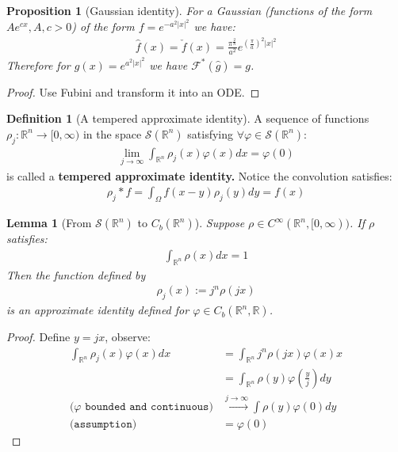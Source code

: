 \documentclass[a4paper,11pt,fleqn]{book}
\newtheorem{lemma}[theorem]{Lemma}
\newtheorem{proposition}[theorem]{Proposition}
\theoremstyle{definition}
\newtheorem{definition}{Definition}[section]
\theoremstyle{remark}
\begin{document}
\begin{proposition}[Gaussian identity]
	For a Gaussian (functions of the form $Ae^{cx}, A, c > 0$) of the form $f = e^{-a^2|x|^2}$ we have:
	\begin{align*}
		\hat{f}(x) = \check{f}(x) =  \frac{\pi^{\frac{2}{n}}}{a^2} e^{(\frac{\pi}{a})^2 |x|^2}
	\end{align*}
	Therefore for $g(x) = e^{a^2 |x|^2}$ we have $\mathcal{F}^*(\hat{g}) = g$. 
\end{proposition}
\begin{proof}
Use Fubini and transform it into an ODE. 
\end{proof}

\begin{definition}[A tempered approximate identity]
	A sequence of functions $\rho_j: \mathbb{R}^n \rightarrow [0, \infty)$ in the space $\mathcal{S}(\mathbb{R}^n)$ satisfying $\forall \varphi \in \mathcal{S}(\mathbb{R}^n)$:
	\begin{align*}
		\lim_{j \rightarrow \infty}\int_{\mathbb{R}^n} \rho_j(x) \varphi(x)dx = \varphi(0)
	\end{align*}
	is called a \textbf{tempered approximate identity. }Notice the convolution satisfies:
	\begin{align*}
		\rho_j * f = \int_\Omega f(x - y)\rho_j(y) dy = f(x)
	\end{align*}
\end{definition}

\begin{lemma}[From $\mathcal{S}(\mathbb{R}^n)$ to $C_b(\mathbb{R}^n)$]
	Suppose $\rho \in C^\infty(\mathbb{R}^n, [0, \infty))$. If $\rho$ satisfies:
	\begin{align*}
		\int_{\mathbb{R}^n} \rho(x) dx = 1
	\end{align*}
	Then the function defined by
	\begin{align*}
		\rho_j(x) := j^n \rho(jx)
	\end{align*}
	is an approximate identity defined for $\varphi \in C_b(\mathbb{R}^n, \mathbb{R})$. 
\end{lemma}
\begin{proof}
	Define $y = jx$, observe:
	\begin{align*}
		\int_{\mathbb{R}^n} \rho_j(x) \varphi(x) dx &= \int_{\mathbb{R}^n} j^n \rho(jx) \varphi(x) x\\
		&= \int_{\mathbb{R}^n}\rho(y) \varphi(\frac{y}{j})dy\\
		(\texttt{$\varphi$ bounded and continuous)}
		&\overset{j \rightarrow \infty}{\longrightarrow}
		\int \rho(y) \varphi(0) dy \\
		\texttt{(assumption)}
		&= \varphi(0)
	\end{align*}
\end{proof}
\end{document}
